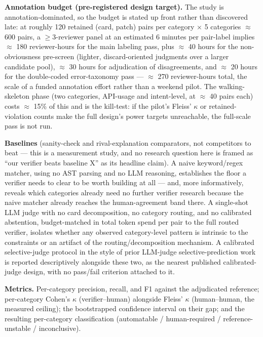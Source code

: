 \documentclass[11pt]{article}
\begin{document}
\medskip
\noindent\textbf{Annotation budget (pre-registered design target).} The study is annotation-dominated, so the budget is stated up front rather than discovered late: at roughly 120 retained (card, patch) pairs per category $\times$ 5 categories $\approx$ 600 pairs, a $\geq 3$-reviewer panel at an estimated 6 minutes per pair-label implies $\approx$ 180 reviewer-hours for the main labeling pass, plus $\approx$ 40 hours for the non-obviousness pre-screen (lighter, discard-oriented judgments over a larger candidate pool), $\approx$ 30 hours for adjudication of disagreements, and $\approx$ 20 hours for the double-coded error-taxonomy pass --- $\approx$ 270 reviewer-hours total, the scale of a funded annotation effort rather than a weekend pilot. The walking-skeleton phase (two categories, API-usage and intent-level, at $\approx$ 40 pairs each) costs $\approx$ 15\% of this and is the kill-test: if the pilot's Fleiss' $\kappa$ or retained-violation counts make the full design's power targets unreachable, the full-scale pass is not run.

\textbf{Baselines} (sanity-check and rival-explanation comparators, not competitors to beat --- this is a measurement study, and no research question here is framed as ``our verifier beats baseline X'' as its headline claim). A naive keyword/regex matcher, using no AST parsing and no LLM reasoning, establishes the floor a verifier needs to clear to be worth building at all --- and, more informatively, reveals which categories already need no further verifier research because the naive matcher already reaches the human-agreement band there. A single-shot LLM judge with no card decomposition, no category routing, and no calibrated abstention, budget-matched in total token spend per pair to the full routed verifier, isolates whether any observed category-level pattern is intrinsic to the constraints or an artifact of the routing/decomposition mechanism. A calibrated selective-judge protocol in the style of prior LLM-judge selective-prediction work is reported descriptively alongside these two, as the nearest published calibrated-judge design, with no pass/fail criterion attached to it.

\textbf{Metrics.} Per-category precision, recall, and F1 against the adjudicated reference; per-category Cohen's $\kappa$ (verifier--human) alongside Fleiss' $\kappa$ (human--human, the measured ceiling); the bootstrapped confidence interval on their gap; and the resulting per-category classification (automatable / human-required / reference-unstable / inconclusive).
\end{document}
